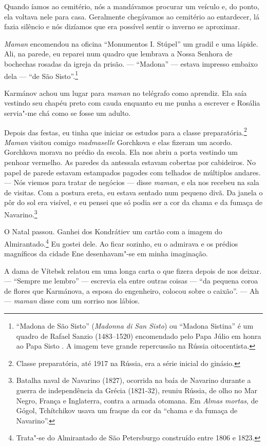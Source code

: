 Quando íamos ao cemitério, nós a mandávamos procurar um veículo e, do
ponto, ela voltava nele para casa. Geralmente chegávamos ao cemitério ao
entardecer, lá fazia silêncio e nós dizíamos que era possível sentir o
inverno se aproximar.

\emph{Maman} encomendou na oficina ``Monumentos I. Stúpel'' um gradil e
uma lápide. Ali, na parede, eu reparei num quadro que lembrava a Nossa
Senhora de bochechas rosadas da igreja da prisão. --- ``Madona'' ---
estava impresso embaixo dela --- ``de São Sisto''.\footnote{``Madona de
  São Sisto'' (\emph{Madonna di San Sisto}) ou ``Madona Sistina'' é um
  quadro de Rafael Sanzio (1483--1520) encomendado pelo Papa Júlio \scalebox{.8}{II} em
  honra ao Papa Sisto \scalebox{.8}{IV}. A imagem teve grande repercussão na Rússia
  oitocentista.}

Karmánov achou um lugar para \emph{maman} no telégrafo como aprendiz.
Ela saía vestindo seu chapéu preto com cauda enquanto eu me punha a
escrever e Rosália servia"-me chá como se fosse um adulto.

Depois das festas, eu tinha que iniciar os estudos para a classe
preparatória.\footnote{Classe preparatória, até 1917 na Rússia, era a
  série inicial do ginásio.} \emph{Maman} visitou comigo
\emph{madmaselle} Gorchkova e elas fizeram um acordo. Gorchkova morava
no prédio da escola. Ela nos abriu a porta vestindo um penhoar vermelho.
As paredes da antessala estavam cobertas por cabideiros. No papel de
parede estavam estampados pagodes com telhados de múltiplos andares. ---
Nós viemos para tratar de negócios --- disse \emph{maman}, e ela nos
recebeu na sala de visitas. Com a postura ereta, eu estava sentado num
pequeno divã. Da janela o pôr do sol era visível, e eu pensei que só
podia ser a cor da chama e da fumaça de Navarino.\footnote{Batalha naval
  de Navarino (1827), ocorrida na baía de Navarino durante a guerra de
  independência da Grécia (1821-32), reuniu Rússia, de olho no Mar
  Negro, França e Inglaterra, contra a armada otomana. Em \emph{Almas
  mortas}, de Gógol, Tchítchikov usava um fraque da cor da ``chama e da
  fumaça de Navarino''.}

O Natal passou. Ganhei dos Kondrátiev um cartão com a imagem do
Almirantado.\footnote{Trata"-se do Almirantado de São Petersburgo
  construído entre 1806 e 1823.} Eu gostei dele. Ao ficar sozinho, eu o
admirava e os prédios magníficos da cidade Ene desenhavam"-se em minha
imaginação.

A dama de Vítebsk relatou em uma longa carta o que fizera depois de nos
deixar. --- ``Sempre me lembro'' --- escrevia ela entre outras coisas
--- ``da pequena coroa de flores que Karmánova, a esposa do engenheiro,
colocou sobre o caixão''. --- Ah --- \emph{maman} disse com um sorriso
nos lábios.

